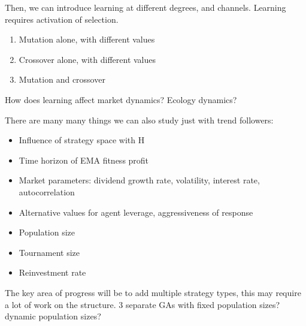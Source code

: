 \documentclass{article}
\begin{document}
Then, we can introduce learning at different degrees, and channels. Learning requires activation of selection.

\begin{enumerate}
    \item Mutation alone, with different values
    \item Crossover alone, with different values
    \item Mutation and crossover
\end{enumerate}

How does learning affect market dynamics? Ecology dynamics?

There are many many things we can also study just with trend followers:
\begin{itemize}
    \item Influence of strategy space with H
    \item Time horizon of EMA fitness profit
    \item Market parameters: dividend growth rate, volatility, interest rate, autocorrelation
    \item Alternative values for agent leverage, aggressiveness of response 
    \item Population size
    \item Tournament size
    \item Reinvestment rate
\end{itemize}

The key area of progress will be to add multiple strategy types, this may require a lot of work on the structure. 3 separate GAs with fixed population sizes? dynamic population sizes?
\end{document}
